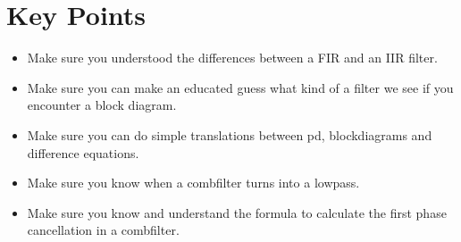 



\section{Key Points}
\begin{itemize}
	\item Make sure you understood the differences between a FIR and an IIR filter.
	\item Make sure you can make an educated guess what kind of a filter we see if you encounter a block diagram.
	\item Make sure you can do simple translations between pd, blockdiagrams and difference equations.
	\item Make sure you know when a combfilter turns into a lowpass.
	\item Make sure you know and understand the formula to calculate the first phase cancellation in a combfilter.
\end{itemize}
















